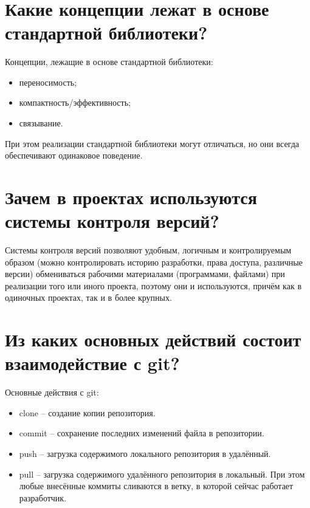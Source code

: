 \documentclass[a4paper,12pt]{article}	%
\title{
	\center{\textbf{Контрольные вопросы. Задание 12.}}
	}
\begin{document}

\maketitle

\section{Какие концепции лежат в основе стандартной библиотеки?}
	
	Концепции, лежащие в основе стандартной библиотеки:
	
	\begin{itemize}
	
		\item переносимость;
		
		\item компактность/эффективность;
		
		\item связывание.
	
	\end{itemize}
	
	При этом реализации стандартной библиотеки могут отличаться, но они всегда обеспечивают одинаковое поведение.
		
\newpage

\section{Зачем в проектах используются системы контроля версий?}

	Системы контроля версий позволяют удобным, логичным и контролируемым образом (можно контролировать историю разработки, права доступа, различные версии) обмениваться рабочими материалами (программами, файлами) при реализации того или иного проекта, поэтому они и используются, причём как в одиночных проектах, так и в более крупных.
	
\newpage

\section{Из каких основных действий состоит взаимодействие с git?}
	
	Основные действия с git:
	
	\begin{itemize}
	
		\item clone -- создание копии репозитория.
		
		\item commit -- сохранение последних изменений файла в репозитории.
		
		\item push -- загрузка содержимого локального репозитория в удалённый.
		
		\item pull -- загрузка содержимого удалённого репозитория в локальный. При этом любые внесённые коммиты сливаются в ветку, в которой сейчас работает разработчик.
	
	\end{itemize}
	
\end{document}
